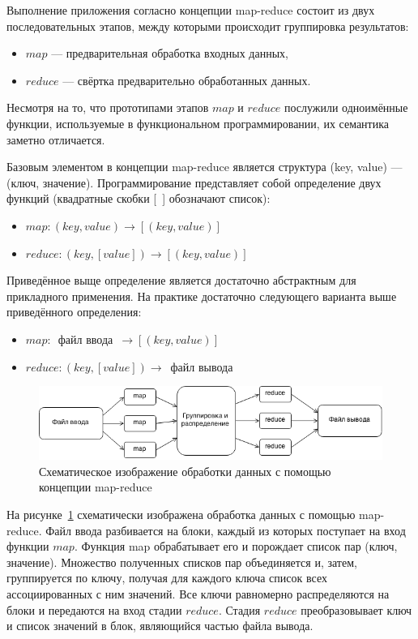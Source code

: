\documentclass[12pt,a4paper,oneside]{extarticle}
\begin{document}
        Выполнение приложения согласно концепции map-reduce состоит из двух последовательных этапов, между которыми происходит группировка результатов:
        \begin{itemize}
            \item $map$ --- предварительная обработка входных данных,
            \item $reduce$ --- свёртка предварительно обработанных данных.
        \end{itemize}

        Несмотря на то, что прототипами этапов $map$ и $reduce$ послужили одноимённые функции, используемые в функциональном программировании, их семантика заметно отличается.

        Базовым элементом в концепции map-reduce является структура (key, value) --- (ключ, значение). Программирование представляет собой определение двух функций (квадратные скобки [~] обозначают список):
        \begin{itemize}
            \item $map: (key, value)\rightarrow[(key, value)]$
            \item $reduce: (key, [value])\rightarrow[(key, value)]$
        \end{itemize}

        Приведённое выще определение является достаточно абстрактным для прикладного применения. На практике достаточно следующего варианта выше приведённого определения:
        \begin{itemize}
            \item $map: $~файл ввода~$\rightarrow[(key, value)]$
            \item $reduce: (key, [value])\rightarrow$~файл вывода
        \end{itemize}


        \begin{figure}[h!]
            \centering
            \includegraphics[scale=0.7]{mapreduce.png}
            \caption{Схематическое изображение обработки данных с помощью концепции map-reduce}
            \label{pic:mapreduce}
        \end{figure}

        На рисунке~\ref{pic:mapreduce} схематически изображена обработка данных с помощью map-reduce. Файл ввода разбивается на блоки, каждый из которых поступает на вход функции $map$. Функция map обрабатывает его и порождает список пар (ключ, значение). Множество полученных списков пар объединяется и, затем, группируется по ключу, получая для каждого ключа список всех ассоциированных с ним значений. Все ключи равномерно распределяются на блоки и передаются на вход стадии $reduce$. Стадия $reduce$ преобразовывает ключ и список значений в блок, являющийся частью файла вывода.
\end{document}
